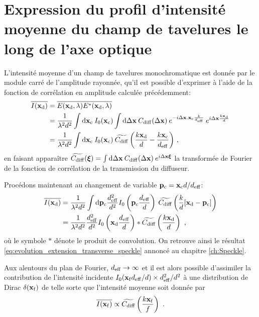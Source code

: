 \section{Expression du profil d'intensité moyenne du champ de tavelures le long de l'axe optique}
L'intensité moyenne d'un champ de tavelures monochromatique est donnée par le module carré de l'amplitude rayonnée, qu'il est possible d'exprimer à l'aide de la fonction de corrélation en amplitude calculée précédemment:
\begin{align}
\overline{I(\mathbf{x}_{\mathrm{d}})} &= \overline{E(\mathbf{x}_{\mathrm{d}},\lambda) E^*(\mathbf{x}_{\mathrm{d}},\lambda)} \\
&= \frac{1}{\lambda^2 d^2} \int{\mathop{}\mathopen{}\mathrm{d}\mathbf{x}_{\mathrm{c}}\: I_0(\mathbf{x}_{\mathrm{c}}) \int{\mathop{}\mathopen{}\mathrm{d}\Delta\mathbf{x}\: C_{\mathrm{diff}}(\Delta\mathbf{x}) \: e^{-i \Delta\mathbf{x}. \mathbf{x}_{\mathrm{c}}\frac{k}{d_{\mathrm{eff}}}} \: e^{i\Delta\mathbf{x}\frac{k \mathbf{x}_{\mathrm{d}}}{d}}}} \\
&= \frac{1}{\lambda^2 d^2} \int{\mathop{}\mathopen{}\mathrm{d}\mathbf{x}_{\mathrm{c}}\: I_0(\mathbf{x}_{\mathrm{c}}) \: \widetilde{C_{\mathrm{diff}}}\left(\frac{k\mathbf{x}_{\mathrm{d}}}{d} - \frac{k\mathbf{x}_{\mathrm{c}}}{d_{\mathrm{eff}}}\right)} \text{ ,}
\end{align}
en faisant apparaître $\widetilde{C_{\mathrm{diff}}}(\boldsymbol{\xi})= \int{\mathop{}\mathopen{}\mathrm{d}\Delta\mathbf{x}\: C_{\mathrm{diff}}(\Delta\mathbf{x}) \: e^{i\Delta\mathbf{x}\boldsymbol{\xi}}}$ la transformée de Fourier de la fonction de corrélation de la transmission du diffuseur.

Procédons maintenant au changement de variable $\mathbf{p}_{\mathrm{c}} = \mathbf{x}_{\mathrm{c}} d/d_{\mathrm{eff}}$:
\begin{align}
\overline{I(\mathbf{x}_{\mathrm{d}})} &= \frac{1}{\lambda^2d^2} \int{\mathop{}\mathopen{}\mathrm{d}\mathbf{p}_{\mathrm{c}} \frac{d_{\mathrm{eff}}^2}{d^2} I_0\left( \mathbf{p}_{\mathrm{c}} \frac{d_{\mathrm{eff}}}{d}\right) \: \widetilde{C_{\mathrm{diff}}} \left( \frac{k}{d} [\mathbf{x}_{\mathrm{d}}- \mathbf{p}_{\mathrm{c}}] \right)} \\
&= \frac{1}{\lambda^2 d^2} \frac{d_{\mathrm{eff}}^2}{d^2} I_0\left( \mathbf{x}_{\mathrm{d}} \frac{d_{\mathrm{eff}}}{d}\right) \ast \widetilde{C_{\mathrm{diff}}}\left( \frac{k\mathbf{x}_{\mathrm{d}}}{d}\right) \text{ ,}
\end{align}
où le symbole $\ast$ dénote le produit de convolution. On retrouve ainsi le résultat \ref{eq:evolution_extension_transverse_speckle} annoncé au chapitre \ref{ch:Speckle}.

Aux alentours du plan de Fourier, $d_{\mathrm{eff}}\rightarrow\infty$ et il est alors possible d'assimiler la contribution de l'intensité incidente $I_0(\mathbf{x}_{\mathrm{f}} d_{\mathrm{eff}}/d) \times d_{\mathrm{eff}}^2/d^2$ à une distribution de Dirac $\delta(\mathbf{x}_{\mathrm{f}})$ de telle sorte que l'intensité moyenne soit donnée par
\begin{equation}
\overline{I(\mathbf{x}_{\mathrm{f}})} \propto \widetilde{C_{\mathrm{diff}}}\left( \frac{k\mathbf{x}_{\mathrm{f}}}{f}\right) \text{ .}
\end{equation}




